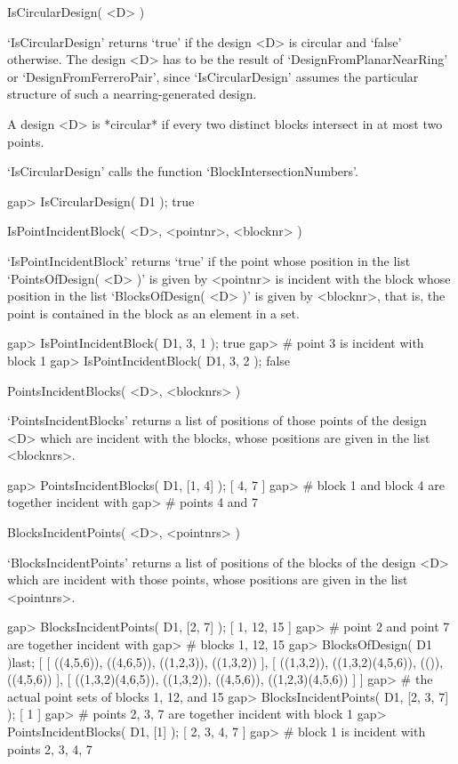 \>IsCircularDesign( <D> )

`IsCircularDesign' returns `true' if the design <D> is circular and `false'
otherwise. The design <D> has to be the result of `DesignFromPlanarNearRing'
or `DesignFromFerreroPair', since `IsCircularDesign' assumes the particular
structure of such a nearring-generated design. 

A design <D> is *circular* if every two distinct blocks intersect in at most
two points.

`IsCircularDesign' calls the function `BlockIntersectionNumbers'.  

\beginexample 
    gap> IsCircularDesign( D1 );
    true
\endexample    
  



\>IsPointIncidentBlock( <D>, <pointnr>, <blocknr> )

`IsPointIncidentBlock' returns `true' if the point whose position in the list 
`PointsOfDesign( <D> )' is given by <pointnr> is incident with the block
whose position in the list `BlocksOfDesign( <D> )' is given by <blocknr>, 
that is, the point is contained in the block as an element in a set.

\beginexample
    gap> IsPointIncidentBlock( D1, 3, 1 );
    true
    gap> # point 3 is incident with block 1
    gap> IsPointIncidentBlock( D1, 3, 2 );       
    false
\endexample

\>PointsIncidentBlocks( <D>, <blocknrs> )

`PointsIncidentBlocks' returns a list of positions of those points of the 
design <D> which are incident with the blocks, whose positions are given in
the list <blocknrs>.

\beginexample
    gap> PointsIncidentBlocks( D1, [1, 4] );                 
    [ 4, 7 ]
    gap> # block 1 and block 4 are together incident with 
    gap> # points 4 and 7
\endexample

\>BlocksIncidentPoints( <D>, <pointnrs> )

`BlocksIncidentPoints' returns a list of positions of the blocks of the 
design <D> which are incident with those points, whose positions are given 
in the list <pointnrs>.

\beginexample
    gap> BlocksIncidentPoints( D1, [2, 7] );   
    [ 1, 12, 15 ]
    gap> # point 2 and point 7 are together incident with     
    gap> # blocks 1, 12, 15
    gap> BlocksOfDesign( D1 ){last};
    [ [ ((4,5,6)), ((4,6,5)), ((1,2,3)), ((1,3,2)) ], 
      [ ((1,3,2)), ((1,3,2)(4,5,6)), (()), ((4,5,6)) ], 
      [ ((1,3,2)(4,6,5)), ((1,3,2)), ((4,5,6)), ((1,2,3)(4,5,6)) ] ]
    gap> # the actual point sets of blocks 1, 12, and 15 
    gap> BlocksIncidentPoints( D1, [2, 3, 7] );
    [ 1 ]
    gap> # points 2, 3, 7 are together incident with block 1
    gap> PointsIncidentBlocks( D1, [1] );
    [ 2, 3, 4, 7 ]
    gap> # block 1 is incident with points 2, 3, 4, 7 
\endexample



